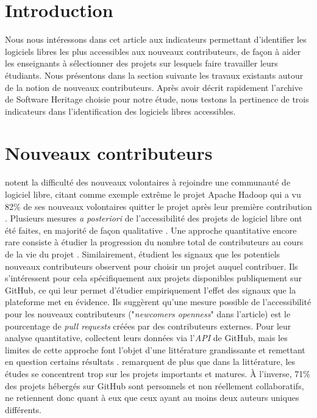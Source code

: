 \documentclass[dvipsnames,runningheads]{llncs}
\newcommand{\en}[1]{\foreignlanguage{english}{\emph{#1}}}
\begin{document}
    \section{Introduction}

    Nous nous intéressons dans cet article aux indicateurs permettant d'identifier les logiciels libres les
    plus accessibles aux nouveaux contributeurs, de façon à aider les enseignants à sélectionner des projets
    sur lesquels faire travailler leurs étudiants. Nous présentons dans la section suivante les travaux
    existants autour de la notion de nouveaux contributeurs. Après avoir décrit rapidement l'archive de
    Software Heritage choisie pour notre étude, nous testons la pertinence de trois indicateurs dans
    l'identification des logiciels libres accessibles.

    \section{Nouveaux contributeurs}

    \textcite{barriers-2018} notent la difficulté des nouveaux volontaires à rejoindre une communauté de
    logiciel libre, citant comme exemple extrême le projet Apache Hadoop qui a vu 82\% de ses nouveaux
    volontaires quitter le projet après leur première contribution \parencite{hadoop-dropout-2013}. Plusieurs
    mesures \emph{a posteriori} de l'accessibilité des projets de logiciel libre ont été faites, en majorité
    de façon qualitative \parencites{newcomers-accessibility-2016}{newcomers-onboarding-2018}. Une approche
    quantitative encore rare consiste à étudier la progression du nombre total de contributeurs au cours de la
    vie du projet \cite{contributor-count-2006}. Similairement, \textcite{signals-2019} étudient les signaux
    que les potentiels nouveaux contributeurs observent pour choisir un projet auquel contribuer. Ils
    s'intéressent pour cela spécifiquement aux projets disponibles publiquement sur GitHub, ce qui leur permet
    d'étudier empiriquement l'effet des signaux que la plateforme met en évidence. Ils suggèrent qu'une mesure
    possible de l'accessibilité pour les nouveaux contributeurs ("\en{newcomers openness}" dans l'article) est
    le pourcentage de \en{pull requests} créées par des contributeurs externes. Pour leur analyse
    quantitative, \textcite{signals-2019} collectent leurs données via l'\en{API} de GitHub, mais les limites
    de cette approche font l'objet d'une littérature grandissante et remettant en question certains résultats
    \parencite{mining-github-2014,penumbra-oss-2022}. \textcite{barriers-meta-2015} remarquent de plus que
    dans la littérature, les études se concentrent trop sur les projets importants et matures. À l'inverse,
    71\% des projets hébergés sur GitHub sont personnels et non réellement collaboratifs,
    \textcite{mining-github-2014} ne retiennent donc quant à eux que ceux ayant au moins deux auteurs uniques
    différents.
\end{document}
